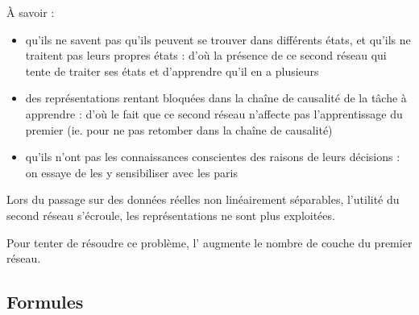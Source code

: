     À savoir :
    \begin{itemize}
    \item qu'ils ne savent pas qu'ils peuvent se trouver dans différents états, et qu'ils ne traitent pas leurs propres états : 
    d'où la présence de ce second réseau qui tente de traiter ses états et d'apprendre qu'il en a plusieurs
    \item des représentations rentant bloquées dans la chaîne de causalité de la tâche à apprendre : d'où
    le fait que ce second réseau n'affecte pas l'apprentissage du premier (ie. pour ne pas retomber dans la chaîne de causalité)
    \item qu'ils n'ont pas les connaissances conscientes des raisons de leurs décisions : on essaye de les y sensibiliser avec les paris
    \\[0.2cm]
    \end{itemize}
  
    Lors du passage sur des données réelles non linéairement séparables, l'utilité du second réseau
    s'écroule, les représentations ne sont plus exploitées.
    
    Pour tenter de résoudre ce problème, l' augmente le nombre de couche du premier réseau.

  \newpage 
  \subsection{Formules}
    
    
    


